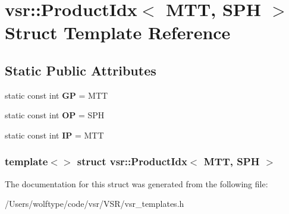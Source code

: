 \hypertarget{structvsr_1_1_product_idx_3_01_m_t_t_00_01_s_p_h_01_4}{\section{vsr\-:\-:Product\-Idx$<$ M\-T\-T, S\-P\-H $>$ Struct Template Reference}
\label{structvsr_1_1_product_idx_3_01_m_t_t_00_01_s_p_h_01_4}
}
\subsection*{Static Public Attributes}
\begin{DoxyCompactItemize}
\item 
\hypertarget{structvsr_1_1_product_idx_3_01_m_t_t_00_01_s_p_h_01_4_ae8cd5c11208c13b25edf57ae73f094c1}{static const int {\bfseries G\-P} = M\-T\-T}\label{structvsr_1_1_product_idx_3_01_m_t_t_00_01_s_p_h_01_4_ae8cd5c11208c13b25edf57ae73f094c1}

\item 
\hypertarget{structvsr_1_1_product_idx_3_01_m_t_t_00_01_s_p_h_01_4_ae094b5a80f0b6ce131620d499a5c20d1}{static const int {\bfseries O\-P} = S\-P\-H}\label{structvsr_1_1_product_idx_3_01_m_t_t_00_01_s_p_h_01_4_ae094b5a80f0b6ce131620d499a5c20d1}

\item 
\hypertarget{structvsr_1_1_product_idx_3_01_m_t_t_00_01_s_p_h_01_4_a903a1521dcb6aa93ad893d6ffaac8d84}{static const int {\bfseries I\-P} = M\-T\-T}\label{structvsr_1_1_product_idx_3_01_m_t_t_00_01_s_p_h_01_4_a903a1521dcb6aa93ad893d6ffaac8d84}

\end{DoxyCompactItemize}
\subsubsection*{template$<$$>$ struct vsr\-::\-Product\-Idx$<$ M\-T\-T, S\-P\-H $>$}



The documentation for this struct was generated from the following file\-:\begin{DoxyCompactItemize}
\item 
/\-Users/wolftype/code/vsr/\-V\-S\-R/vsr\-\_\-templates.\-h\end{DoxyCompactItemize}
